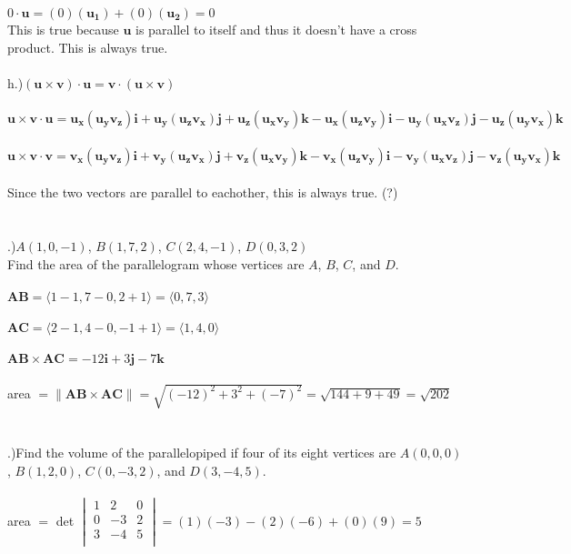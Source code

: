 \documentclass[12pt]{article}
\begin{document}
$0 \cdot \mathbf{u} = (0)(\mathbf{u_{1}}) +(0)(\mathbf{u_{2}})= 0$\\
This is true because $\mathbf{u}$ is parallel to itself and thus it doesn't have a cross product. This is always true.\\\\
h.)$(\mathbf{u \times v})\cdot \mathbf{u} = \mathbf{v} \cdot (\mathbf{u \times v})$\\\\
$\mathbf{u \times v }\cdot \mathbf{u} = \mathbf{u_{x}}(\mathbf{u_{y}v_{z}})\mathbf{i} + \mathbf{u_{y}}(\mathbf{u_{z}v_{x}})\mathbf{j} + \mathbf{u_{z}}(\mathbf{u_{x}v_{y}})\mathbf{k} -\mathbf{u_{x}}(\mathbf{u_{z}v_{y}})\mathbf{i} - \mathbf{u_{y}}(\mathbf{u_{x}v_{z}})\mathbf{j}-\mathbf{u_{z}}(\mathbf{u_{y}v_{x}})\mathbf{k}$\\\\
$\mathbf{u \times v } \cdot \mathbf{v}= \mathbf{v_{x}}(\mathbf{u_{y}v_{z}})\mathbf{i} + \mathbf{v_{y}}(\mathbf{u_{z}v_{x}})\mathbf{j} + \mathbf{v_{z}}(\mathbf{u_{x}v_{y}})\mathbf{k} -\mathbf{v_{x}}(\mathbf{u_{z}v_{y}})\mathbf{i} - \mathbf{v_{y}}(\mathbf{u_{x}v_{z}})\mathbf{j}-\mathbf{v_{z}}(\mathbf{u_{y}v_{x}})\mathbf{k}$\\\\
Since the two vectors are parallel to eachother, this is always true. (?)\\\\\\


.)$A(1, 0, -1)$, \hspace{10pt} $B(1, 7, 2)$, \hspace{10pt} $C(2, 4, -1)$, \hspace{10pt} $D(0, 3, 2)$\\
Find the area of the parallelogram whose vertices are $A$, $B$, $C$, and $D$.\\\\
$\mathbf{AB} = \langle 1-1, 7-0, 2+1\rangle = \langle 0, 7, 3\rangle$\\\\
$\mathbf{AC} = \langle 2-1, 4-0, -1+1\rangle = \langle 1, 4, 0\rangle$\\\\
$\mathbf{AB \times AC} = -12\mathbf{i} +3\mathbf{j} -7\mathbf{k}$\\\\
area $=\| \mathbf{AB \times AC} \| = \sqrt{(-12)^{2} + 3^{2} + (-7)^{2}} = \sqrt{144 + 9 + 49} = \sqrt{202}$\\\\\\



.)Find the volume of the parallelopiped if four of its eight vertices are $A(0, 0, 0)$, $B(1, 2, 0)$, $C(0, -3, 2)$, and $D(3, -4, 5)$.\\\\

area $=$ det
$\begin{vmatrix}
1 & 2 & 0 \\ 
0 & -3 & 2 \\ 
3 & -4 & 5 \\ 
\end{vmatrix} = (1)(-3) - (2)(-6) + (0)(9) = 5$
\end{document}
